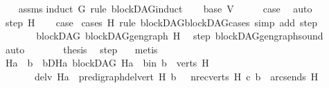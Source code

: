 \begin{isabellebody}
%
\isadelimproof
\ \ %
\endisadelimproof
%
\isatagproof
{}\isamarkupfalse%
\ assms\isanewline
{}\isamarkupfalse%
{\isacharparenleft}{\kern0pt}induct\ G\ rule{\isacharcolon}{\kern0pt}\ blockDAG{\isacharunderscore}{\kern0pt}induct{\isacharparenright}{\kern0pt}\isanewline
\ \ \isamarkupfalse%
\ {\isacharparenleft}{\kern0pt}base\ V{\isacharparenright}{\kern0pt}\isanewline
\ \ \isamarkupfalse%
\ \isamarkupfalse%
\ {\isacharquery}{\kern0pt}case\ \isamarkupfalse%
\ auto\isanewline
{}\isamarkupfalse%
\isanewline
\ \ \isamarkupfalse%
\ {\isacharparenleft}{\kern0pt}step\ H{\isacharparenright}{\kern0pt}\isanewline
\ \ \isamarkupfalse%
\ {\isacharquery}{\kern0pt}case\ \isamarkupfalse%
{\isacharparenleft}{\kern0pt}cases\ H\ rule{\isacharcolon}{\kern0pt}\ blockDAG{\isachardot}{\kern0pt}blockDAG{\isacharunderscore}{\kern0pt}cases{}{\isacharcomma}{\kern0pt}\ simp\ add{\isacharcolon}{\kern0pt}\ step{\isacharparenright}{\kern0pt}\isanewline
\ \ \ \ \isamarkupfalse%
\ {}\isanewline
\ \ \ \ \isamarkupfalse%
\ \isamarkupfalse%
\ {\isachardoublequoteopen}blockDAG\ {\isacharparenleft}{\kern0pt}blockDAG{\isachardot}{\kern0pt}gen{\isacharunderscore}{\kern0pt}graph\ H{\isacharparenright}{\kern0pt}{\isachardoublequoteclose}\ \isamarkupfalse%
\ step{\isacharparenleft}{\kern0pt}{}{\isacharparenright}{\kern0pt}\ blockDAG{\isachardot}{\kern0pt}gen{\isacharunderscore}{\kern0pt}graph{\isacharunderscore}{\kern0pt}sound\ \isamarkupfalse%
\ auto\isanewline
\ \ \ \ \isamarkupfalse%
\ \isamarkupfalse%
\ {\isacharquery}{\kern0pt}thesis\ \isamarkupfalse%
\ step{\isacharparenleft}{\kern0pt}{}{\isacharparenright}{\kern0pt}\ {}\ \isamarkupfalse%
\ metis\ \isanewline
\ \ \isamarkupfalse%
\isanewline
\ \ \ \ \isamarkupfalse%
\ {}\isanewline
\ \ \ \ \isamarkupfalse%
\ \isamarkupfalse%
\ Ha\ \ b\ \ bD{\isacharunderscore}{\kern0pt}Ha{\isacharcolon}{\kern0pt}\ {\isachardoublequoteopen}blockDAG\ Ha{\isachardoublequoteclose}\ \ b{\isacharunderscore}{\kern0pt}in{\isacharcolon}{\kern0pt}\ {\isachardoublequoteopen}b\ {\isasymin}\ verts\ H{\isachardoublequoteclose}\isanewline
\ \ \ \ \ \ \ del{\isacharunderscore}{\kern0pt}v{\isacharcolon}{\kern0pt}\ {\isachardoublequoteopen}Ha\ {\isacharequal}{\kern0pt}\ pre{\isacharunderscore}{\kern0pt}digraph{\isachardot}{\kern0pt}del{\isacharunderscore}{\kern0pt}vert\ H\ b\ {\isachardoublequoteclose}\ \ nre{\isacharcolon}{\kern0pt}{\isachardoublequoteopen}{\isacharparenleft}{\kern0pt}{\isasymforall}c{\isasymin}verts\ H{\isachardot}{\kern0pt}\ {\isacharparenleft}{\kern0pt}c{\isacharcomma}{\kern0pt}\ b{\isacharparenright}{\kern0pt}\ {\isasymnotin}\ {\isacharparenleft}{\kern0pt}arcs{\isacharunderscore}{\kern0pt}ends\ H{\isacharparenright}{\kern0pt}\isactrlsup {\isacharplus}{\kern0pt}{\isacharparenright}{\kern0pt}{\isachardoublequoteclose}\isanewline

\end{isabellebody}
